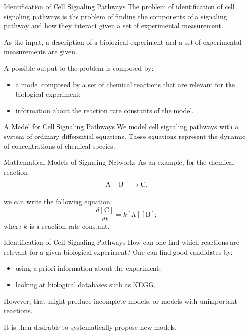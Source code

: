 \documentclass{beamer}
\begin{document}






\begin{frame}{Identification of Cell Signaling Pathways}
The problem of identification of cell signaling pathways is the problem
of finding the components of a signaling pathway and how they interact
given a set of experimental measurement.

\pause
As the input, a description of a biological experiment and a set of 
experimental measurements are given. 
    
\pause A possible output to the problem is composed by:
\begin{itemize}
    \pause
    \item{a model composed by a set of chemical reactions that are 
        relevant for the biological experiment;}
    \pause
    \item{information about the reaction rate constants of the model.}
\end{itemize}
\end{frame}


\begin{frame}{A Model for Cell Signaling Pathways}
We model cell signaling pathways with a system of ordinary differential
equations. These equations represent the dynamic of concentrations of 
chemical species.
\end{frame}


\begin{frame}{Mathematical Models of Signaling Networks}
As an example, for the chemical reaction
\begin{equation*}
\ce{
    A + B -> C
},
\end{equation*}

\pause
we can write the following equation:
\begin{equation*}
    \frac{d[\text{C}]}{dt} = k[\text{A}][\text{B}]; 
\end{equation*}
where $k$ is a reaction rate constant.
\end{frame}



\begin{frame}{Identification of Cell Signaling Pathways}
How can one find which reactions are relevant for a given biological 
experiment? One can find good candidates by:
\pause
\begin{itemize}
    \item{using a priori information about the experiment;}
\pause
    \item{looking at biological databases such as KEGG.}
\end{itemize}
\pause
However, that might produce incomplete models, or models with 
unimportant reactions.

\pause
It is then desirable to systematically propose new models. 
\end{frame}
\end{document}
